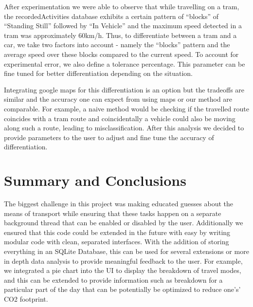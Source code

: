 \documentclass[10pt,conference,compsocconf]{IEEEtran}
\begin{document}
After experimentation we were able to observe that while travelling on a tram, the recordedActivities database exhibits a certain pattern of “blocks” of “Standing Still” followed by “In Vehicle” and the maximum speed detected in a tram was approximately 60km/h. Thus, to differentiate between a tram and a car, we take two factors into account - namely the “blocks” pattern and the average speed over these blocks compared to the current speed. To account for experimental error, we also define a tolerance percentage. This parameter can be fine tuned for better differentiation depending on the situation.

Integrating google maps for this differentiation is an option but the tradeoffs are similar and the accuracy one can expect from using maps or our method are comparable. For example, a naive method would be checking if the travelled route coincides with a tram route and coincidentally a vehicle could also be moving along such a route, leading to misclassification. After this analysis we decided to provide parameters to the user to adjust and fine tune the accuracy of differentiation.

\section{Summary and Conclusions}

The biggest challenge in this project was making educated guesses about the means of transport while ensuring that these tasks happen on a separate background thread that can be enabled or disabled by the user. Additionally we ensured that this code could be extended in the future with easy by writing modular code with clean, separated interfaces. With the addition of storing everything in an SQLite Database, this can be used for several extensions or more in depth data analysis to provide meaningful feedback to the user. For example, we integrated a pie chart into the UI to display the breakdown of travel modes, and this can be extended to provide information such as breakdown for a particular part of the day that can be potentially be optimized to reduce one's’ CO2 footprint.





\clearpage
\end{document}
